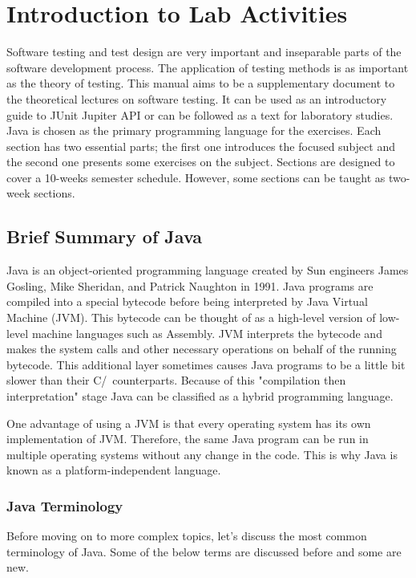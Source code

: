 \chapter{Introduction to Lab Activities}
\label{lab:introduction}
Software testing and test design are very important and inseparable parts of the software development process. The application of testing methods is as important as the theory of testing. This manual aims to be a supplementary document to the theoretical lectures on software testing. It can be used as an introductory guide to JUnit Jupiter API or can be followed as a text for laboratory studies. Java is chosen as the primary programming language for the exercises. Each section has two essential parts; the first one introduces the focused subject and the second one presents some exercises on the subject. Sections are designed to cover a 10-weeks semester schedule. However, some sections can be taught as two-week sections.

\section{Brief Summary of Java}
Java is an object-oriented programming language created by Sun engineers James Gosling, Mike Sheridan, and Patrick Naughton in 1991. Java programs are compiled into a special bytecode before being interpreted by Java Virtual Machine (JVM). This bytecode can be thought of as a high-level version of low-level machine languages such as Assembly. JVM interprets the bytecode and makes the system calls and other necessary operations on behalf of the running bytecode. This additional layer sometimes causes Java programs to be a little bit slower than their C/\CC~counterparts. Because of this "compilation then interpretation" stage Java can be classified as a hybrid programming language. 

One advantage of using a JVM is that every operating system has its own implementation of JVM. Therefore, the same Java program can be run in multiple operating systems without any change in the code. This is why Java is known as a platform-independent language.

\subsection{Java Terminology}
Before moving on to more complex topics, let's discuss the most common terminology of Java. Some of the below terms are discussed before and some are new.

